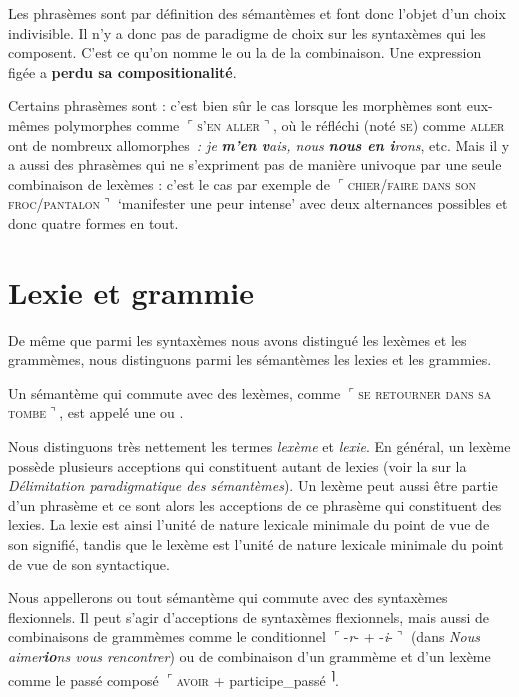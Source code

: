 Les phrasèmes sont par définition des sémantèmes et font donc l’objet d’un choix indivisible. Il n’y a donc pas de paradigme de choix sur les syntaxèmes qui les composent. C’est ce qu’on nomme le  ou la  de la combinaison. Une expression figée a \textbf{perdu sa compositionalité}.

Certains phrasèmes sont : c’est bien sûr le cas lorsque les morphèmes sont eux-mêmes polymorphes comme $⌜$\textsc{s’en} \textsc{aller}$⌝$, où le réfléchi (noté \textsc{se}) comme \textsc{aller} ont de nombreux allomorphes~\textit{: je} \textbf{\textit{m’en} \textit{v}}\textit{ais, nous} \textbf{\textit{nous en i}}\textit{rons}, etc. Mais il y a aussi des phrasèmes qui ne s’expriment pas de manière univoque par une seule combinaison de lexèmes : c’est le cas par exemple de $⌜$\textsc{chier/faire} \textsc{dans} \textsc{son} \textsc{froc/pantalon}$⌝$ ‘manifester une peur intense’ avec deux alternances possibles et donc quatre formes en tout.

\section{Lexie et grammie}\label{sec:2.3.8}

De même que parmi les syntaxèmes nous avons distingué les lexèmes et les grammèmes, nous distinguons parmi les sémantèmes les lexies et les grammies.

Un sémantème qui commute avec des lexèmes, comme $⌜$\textsc{se} \textsc{retourner} \textsc{dans} \textsc{sa} \textsc{tombe}$⌝$, est appelé une  ou .

Nous distinguons très nettement les termes \textit{lexème} et \textit{lexie}. En général, un lexème possède plusieurs acceptions qui constituent autant de lexies (voir la  sur la \textit{Délimitation paradigmatique des sémantèmes}). Un lexème peut aussi être partie d’un phrasème et ce sont alors les acceptions de ce phrasème qui constituent des lexies. La lexie est ainsi l’unité de nature lexicale minimale du point de vue de son signifié, tandis que le lexème est l’unité de nature lexicale minimale du point de vue de son syntactique.

Nous appellerons  ou  tout sémantème qui commute avec des syntaxèmes flexionnels. Il peut s’agir d’acceptions de syntaxèmes flexionnels, mais aussi de combinaisons de grammèmes comme le conditionnel  $⌜${}-\textit{r}{}- + -\textit{i}{}-$⌝$ (dans \textit{Nous aimer}\textbf{\textit{io}}\textit{ns vous rencontrer}) ou de combinaison d’un grammème et d’un lexème comme le passé composé $⌜$\textsc{avoir} + participe\_passé\textsuperscript{ ⌉}.


